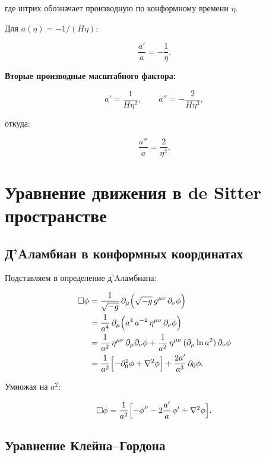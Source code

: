 \documentclass[12pt,a4paper]{article}
\begin{document}
где штрих обозначает производную по конформному времени $\eta$.

Для $a(\eta) = -1/(H\eta)$:

\begin{equation}
\frac{a'}{a} = -\frac{1}{\eta}.
\end{equation}

\textbf{Вторые производные масштабного фактора:}

\begin{equation}
a' = \frac{1}{H\eta^2}, \qquad a'' = -\frac{2}{H\eta^3},
\end{equation}

откуда:

\begin{equation}
\frac{a''}{a} = \frac{2}{\eta^2}.
\end{equation}

\section{Уравнение движения в de Sitter пространстве}

\subsection{Д'Aламбиан в конформных координатах}

Подставляем в определение д'Aламбиана:

\begin{align}
\Box\phi &= \frac{1}{\sqrt{-g}}\,\partial_\mu\Bigl(\sqrt{-g}\,g^{\mu\nu}\,\partial_\nu\phi\Bigr) \\
&= \frac{1}{a^4}\,\partial_\mu\Bigl(a^4\,a^{-2}\,\eta^{\mu\nu}\,\partial_\nu\phi\Bigr) \\
&= \frac{1}{a^2}\,\eta^{\mu\nu}\,\partial_\mu\partial_\nu\phi + \frac{1}{a^2}\,\eta^{\mu\nu}\,(\partial_\mu\ln a^2)\,\partial_\nu\phi \\
&= \frac{1}{a^2}\Bigl[-\partial_0^2\phi + \nabla^2\phi\Bigr] + \frac{2a'}{a^3}\,\partial_0\phi.
\end{align}

Умножая на $a^2$:

\begin{equation}
\Box\phi = \frac{1}{a^2}\Bigl[-\phi'' - 2\frac{a'}{a}\,\phi' + \nabla^2\phi\Bigr].
\end{equation}

\subsection{Уравнение Клейна--Гордона}
\end{document}
